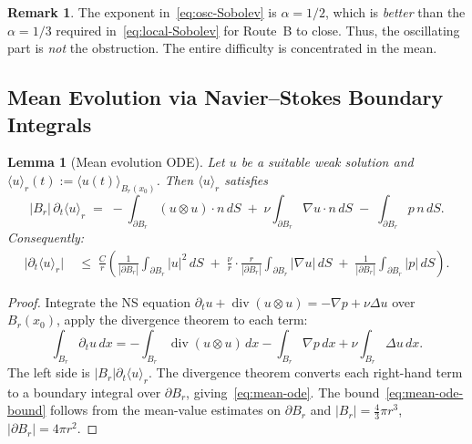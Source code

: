 \documentclass[11pt]{article}
\newtheorem{lemma}[theorem]{Lemma}
\theoremstyle{definition}
\newtheorem{remark}[theorem]{Remark}
\theoremstyle{remark}
\begin{document}
\begin{remark}
  The exponent in~\eqref{eq:osc-Sobolev} is $\alpha=1/2$, which is \emph{better} than
  the $\alpha=1/3$ required in~\eqref{eq:local-Sobolev} for Route~B to close.
  Thus, the oscillating part is \emph{not} the obstruction.
  The entire difficulty is concentrated in the mean.
\end{remark}

\subsection{Mean Evolution via Navier--Stokes Boundary Integrals}

\begin{lemma}[Mean evolution ODE]
\label{lem:mean-ode}
  Let $u$ be a suitable weak solution and $\langle u\rangle_r(t) := \langle u(t)\rangle_{B_r(x_0)}$.
  Then $\langle u\rangle_r$ satisfies
  \begin{equation}\label{eq:mean-ode}
    |B_r|\,\partial_t\langle u\rangle_r
    \;=\; -\int_{\partial B_r}\!(u\otimes u)\cdot n\,dS
           \;+\; \nu\int_{\partial B_r}\!\nabla u\cdot n\,dS
           \;-\; \int_{\partial B_r}\!p\,n\,dS.
  \end{equation}
  Consequently:
  \begin{align}
    \bigl|\partial_t\langle u\rangle_r\bigr|
    &\;\leq\; \frac{C}{r}\left(
       \frac{1}{|\partial B_r|}\int_{\partial B_r}\!\!|u|^2\,dS
       \;+\; \frac{\nu}{r}\cdot\frac{r}{|\partial B_r|}\int_{\partial B_r}\!\!|\nabla u|\,dS
       \;+\; \frac{1}{|\partial B_r|}\int_{\partial B_r}\!\!|p|\,dS
      \right). \label{eq:mean-ode-bound}
  \end{align}
\end{lemma}

\begin{proof}
  Integrate the NS equation $\partial_t u + \operatorname{div}(u\otimes u) = -\nabla p + \nu\Delta u$
  over $B_r(x_0)$, apply the divergence theorem to each term:
  \[
    \int_{B_r}\partial_t u\,dx
    = -\int_{B_r}\operatorname{div}(u\otimes u)\,dx
      -\int_{B_r}\nabla p\,dx
      +\nu\int_{B_r}\Delta u\,dx.
  \]
  The left side is $|B_r|\partial_t\langle u\rangle_r$.
  The divergence theorem converts each right-hand term to a boundary integral
  over $\partial B_r$, giving~\eqref{eq:mean-ode}.
  The bound~\eqref{eq:mean-ode-bound} follows from the mean-value estimates on $\partial B_r$
  and $|B_r|=\tfrac{4}{3}\pi r^3$, $|\partial B_r|=4\pi r^2$.
\end{proof}
\end{document}
